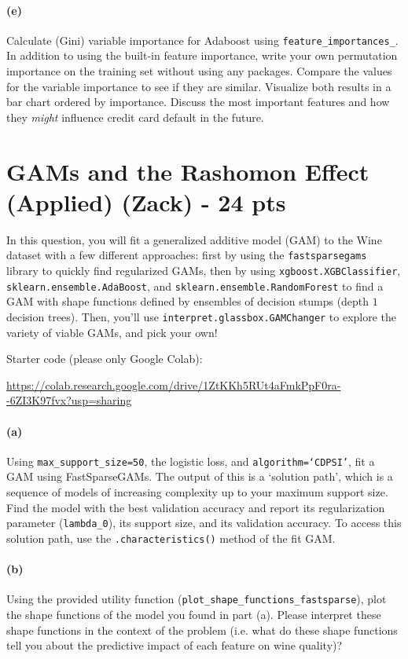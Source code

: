 \documentclass{exam}
\begin{document}
\paragraph{(e)} Calculate (Gini) variable importance for Adaboost using \texttt{feature\_importances\_}. In addition to using the built-in feature importance, write your own permutation importance on the training set without using any packages. Compare the values for the variable importance to see if they are similar. Visualize both results in a bar chart ordered by importance. Discuss the most important features and how they \emph{might} influence credit card default in the future.


\newpage

\section{GAMs and the Rashomon Effect (Applied) (Zack) - 24 pts}

In this question, you will fit a generalized additive model (GAM) to the Wine dataset with a few different approaches: first by using the \texttt{fastsparsegams} library to quickly find regularized GAMs, then by using \texttt{xgboost.XGBClassifier}, 
\texttt{sklearn.ensemble.AdaBoost}, and \texttt{sklearn.ensemble.RandomForest} to find a GAM with shape functions defined by ensembles of decision stumps (depth $1$ decision trees). Then, you'll use \texttt{interpret.glassbox.GAMChanger} to explore the variety of viable GAMs, and pick your own!

\color{blue}
Starter code (please only Google Colab):

\url{https://colab.research.google.com/drive/1ZtKKh5RUt4aFmkPpF0ra--6ZI3K97fvx?usp=sharing}
\color{black}

\paragraph{(a)} Using \texttt{max\_support\_size=50}, the logistic loss, and \texttt{algorithm=`CDPSI'}, fit a GAM using FastSparseGAMs. The output of this is a `solution path', which is a sequence of models of increasing complexity up to your maximum support size. Find the model with the best validation accuracy and report its regularization parameter (\texttt{lambda\_0}), its support size, and its validation accuracy. To access this solution path, use the \texttt{.characteristics()} method of the fit GAM.



\paragraph{(b)} Using the provided utility function (\texttt{plot\_shape\_functions\_fastsparse}), plot the shape functions of the model you found in part (a). Please interpret these shape functions in the context of the problem (i.e. what do these shape functions tell you about the predictive impact of each feature on wine quality)?
\end{document}
